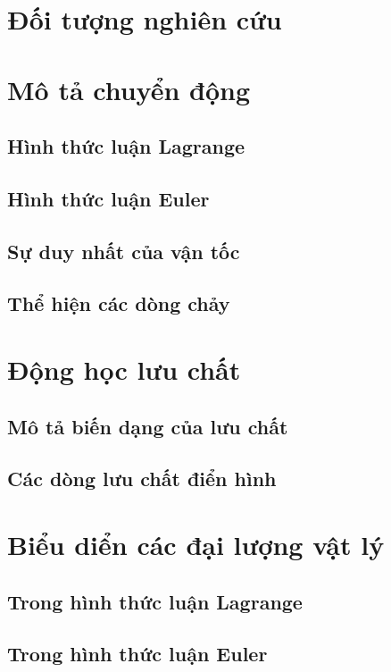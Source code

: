 \documentclass[../../main.tex]{subfiles}
\begin{document}
\section{Đối tượng nghiên cứu}
	
\section{Mô tả chuyển động}
	\subsection{Hình thức luận Lagrange}
		
	\subsection{Hình thức luận Euler}
		
	\subsection{Sự duy nhất của vận tốc}
		
	\subsection{Thể hiện các dòng chảy}
		
\section{Động học lưu chất}
	\subsection{Mô tả biến dạng của lưu chất}
		
	\subsection{Các dòng lưu chất điển hình}
		
\section{Biểu diển các đại lượng vật lý}
	\subsection{Trong hình thức luận Lagrange}
		
	\subsection{Trong hình thức luận Euler}
		
\end{document}
